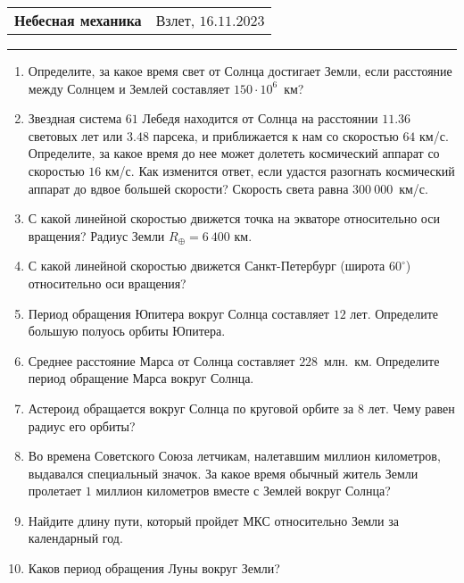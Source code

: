\documentclass[12pt]{article}
\begin{document}
\begin{tabularx}{\textwidth}{Xr}
{\Large \textbf{Небесная механика}} & Взлет, $16.11.2023$ \\
\end{tabularx}
\noindent\rule{\textwidth}{0.4pt}
\begin{enumerate}
    \item Определите, за какое время свет от Солнца достигает Земли, если расстояние между Солнцем и Землей составляет $150\cdot10^6$~км?
    \item Звездная система $61$ Лебедя находится от Солнца на расстоянии $11.36$ световых лет или $3.48$ парсека, и приближается к нам со скоростью $64$ км/с. Определите, за какое время до нее может долететь космический аппарат со скоростью $16$ км/с. Как изменится ответ, если удастся разогнать космический аппарат до вдвое большей скорости? Скорость света равна $300~000$~км/с.
    \item С какой линейной скоростью движется точка на экваторе относительно оси вращения? Радиус Земли $R_{\oplus}=6~400$ км. 
    \item С какой линейной скоростью движется Санкт-Петербург (широта $60^{\circ}$) относительно оси вращения?
    \item Период обращения Юпитера вокруг Солнца составляет $12$ лет. Определите большую полуось орбиты Юпитера.
    \item Среднее расстояние Марса от Солнца составляет $228$~млн.~км. Определите период обращение Марса вокруг Солнца.
    \item Астероид обращается вокруг Солнца по круговой орбите за $8$ лет. Чему равен радиус его орбиты?
    \item Во времена Советского Союза летчикам, налетавшим миллион километров, выдавался специальный значок. За какое время обычный житель Земли пролетает $1$ миллион километров вместе с Землей вокруг Солнца?
    \item Найдите длину пути, который пройдет МКС относительно Земли за календарный год.
    \item Каков период обращения Луны вокруг Земли?
\end{enumerate}
\end{document}
